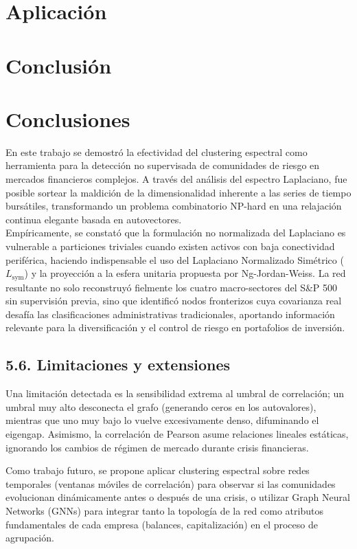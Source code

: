 \documentclass{article}
\begin{document}
	\section*{Aplicación}
	
	\section*{Conclusión}
	\section{Conclusiones}
	En este trabajo se demostró la efectividad del clustering espectral como herramienta para la detección no supervisada de comunidades de riesgo en mercados financieros complejos. A través del análisis del espectro Laplaciano, fue posible sortear la maldición de la dimensionalidad inherente a las series de tiempo bursátiles, transformando un problema combinatorio NP-hard en una relajación continua elegante basada en autovectores.\\
	
	Empíricamente, se constató que la formulación no normalizada del Laplaciano es vulnerable a particiones triviales cuando existen activos con baja conectividad periférica, haciendo indispensable el uso del Laplaciano Normalizado Simétrico (\(L_{\text{sym}}\)) y la proyección a la esfera unitaria propuesta por Ng-Jordan-Weiss. La red resultante no solo reconstruyó fielmente los cuatro macro-sectores del S\&P 500 sin supervisión previa, sino que identificó nodos fronterizos cuya covarianza real desafía las clasificaciones administrativas tradicionales, aportando información relevante para la diversificación y el control de riesgo en portafolios de inversión.
	
	\subsection*{5.6. Limitaciones y extensiones}
	Una limitación detectada es la sensibilidad extrema al umbral de correlación; un umbral muy alto desconecta el grafo (generando ceros en los autovalores), mientras que uno muy bajo lo vuelve excesivamente denso, difuminando el eigengap. Asimismo, la correlación de Pearson asume relaciones lineales estáticas, ignorando los cambios de régimen de mercado durante crisis financieras.
	
	Como trabajo futuro, se propone aplicar clustering espectral sobre redes temporales (ventanas móviles de correlación) para observar si las comunidades evolucionan dinámicamente antes o después de una crisis, o utilizar Graph Neural Networks (GNNs) para integrar tanto la topología de la red como atributos fundamentales de cada empresa (balances, capitalización) en el proceso de agrupación.
	
\end{document}
